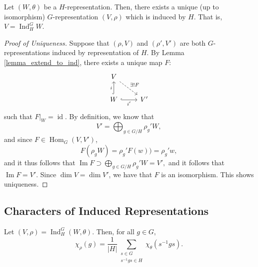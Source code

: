 \documentclass[a4paper]{report}
\theoremstyle{definition}
\theoremstyle{remark}
\theoremstyle{proposition}
\theoremstyle{conjecture}
\theoremstyle{lemma}
\theoremstyle{corollary}
\theoremstyle{exercise}
\theoremstyle{example}
\newcommand{\on}{\operatorname}
\begin{document}
\begin{theorem}
    Let $(W,\theta)$ be a $H$-representation. Then, there exists a unique
    (up to isomorphism) $G$-representation $(V,\rho)$ which is induced by 
    $H$. That is, $V = \on{Ind}_H^GW$.
\end{theorem}

\begin{proof}[Proof of Uniqueness]
    Suppose that $(\rho,V)$ and $(\rho',V')$ are both $G$-representations 
    induced by representation of $H$. By Lemma \ref{lemma_extend_to_ind},
    there exists a unique map $F$: 
    $$\begin{tikzcd}
        V \arrow[rd, "\exists! F", dashed]            &    \\
        W \arrow[r, "i'"', hook] \arrow[u, "i", hook] & V'
    \end{tikzcd}$$
    such that $F\vert_W = \on{id}$.  By definition, we know that 
    $$V' = \bigoplus_{g\in G/H}\rho_g'W,$$
    and since $F \in \on{Hom}_G(V,V')$, 
    $$F(\rho_gW) = \rho_g' F(w)) = \rho_g'w,$$
    and it thus follows that $\on{Im}F \supset \bigoplus_{g\in G/H}\rho_g'W = V',$
    and it follows that $\on{Im}F = V'$. Since $\dim V = \dim V'$, we have that 
    $F$ is an isomorphism. This shows uniqueness.

\end{proof}

\subsection{Characters of Induced Representations}


\begin{theorem}
    Let $(V,\rho) = \on{Ind}_H^G (W,\theta)$. 
    Then, for all $g\in G$, 
    $$\chi_\rho (g) = \frac{1}{\vert H\vert} \sum_{\substack{s\in G\\s^{-1}gs\in H}} \chi_\theta(s^{-1}gs).$$
\end{theorem}
\end{document}
